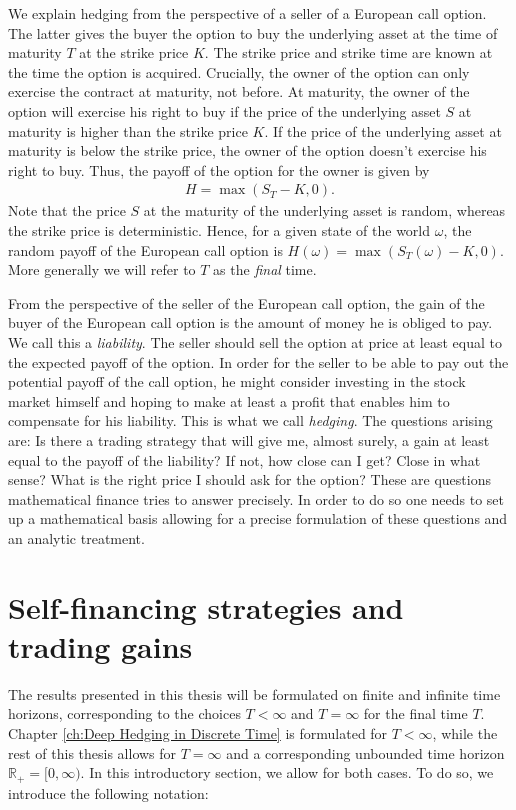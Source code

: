 \documentclass[11pt,a4paper,twoside,openany]{report}
\numberwithin{equation}{section}
\theoremstyle{plain} %
\theoremstyle{definition} %
\theoremstyle{remark} %
\begin{document}
We explain hedging from the perspective of a seller of a European call option. The latter gives the buyer the option to buy the underlying asset at the time of maturity \(T\) at the strike price \(K\). The strike price and strike time are known at the time the option is acquired. Crucially, the owner of the option can only exercise the contract at maturity, not before. At maturity, the owner of the option will exercise his right to buy if the price of the underlying asset \(S\) at maturity is higher than the strike price \(K\). If the price of the underlying asset at maturity is below the strike price, the owner of the option doesn't exercise his right to buy. Thus, the payoff of the option for the owner is given by 
\begin{align*}
    H = \max(S_T-K,0).
\end{align*}
Note that the price \(S\) at the maturity of the underlying asset is random, whereas the strike price is deterministic. Hence, for a given state of the world \(\omega\), the random payoff of the European call option is \(H(\omega)=\max(S_T(\omega)-K,0)\). More generally we will refer to \(T\) as the \textit{final} time.


From the perspective of the seller of the European call option, the gain of the buyer of the European call option is the amount of money he is obliged to pay. We call this a \textit{liability}. The seller should sell the option at price at least equal to the expected payoff of the option. In order for the seller to be able to pay out the potential payoff of the call option, he might consider investing in the stock market himself and hoping to make at least a profit that enables him to compensate for his liability. This is what we call \textit{hedging}. The questions arising are: Is there a trading strategy that will give me, almost surely, a gain at least equal to the payoff of the liability? If not, how close can I get? Close in what sense? What is the right price I should ask for the option? These are questions mathematical finance tries to answer precisely. In order to do so one needs to set up a mathematical basis allowing for a precise formulation of these questions and an analytic treatment. 
\section{Self-financing strategies and trading gains}
The results presented in this thesis will be formulated on finite and infinite time horizons, corresponding to the choices \(T<\infty\) and \(T=\infty\) for the final time \(T\). Chapter \ref{ch:Deep Hedging in Discrete Time} is formulated for \(T<\infty\), while the rest of this thesis allows for \(T=\infty\) and a corresponding unbounded time horizon \(\mathbb{R}_+=[0,\infty)\). In this introductory section, we allow for both cases. To do so, we introduce the following notation:
\end{document}
